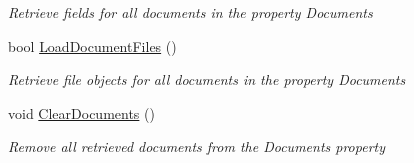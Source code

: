 \begin{DoxyCompactItemize}
\begin{DoxyCompactList}\small\item\em Retrieve fields for all documents in the property \textquotesingle{}Documents\textquotesingle{} \end{DoxyCompactList}\item 
bool \mbox{\hyperlink{class_database_object_acdf5c9ee898d4473350a2f4878af5a23}{Load\+Document\+Files}} ()
\begin{DoxyCompactList}\small\item\em Retrieve file objects for all documents in the property \textquotesingle{}Documents\textquotesingle{} \end{DoxyCompactList}\item 
void \mbox{\hyperlink{class_database_object_af9c4789dea0a14e5a2f914758d3bc54e}{Clear\+Documents}} ()
\begin{DoxyCompactList}\small\item\em Remove all retrieved documents from the \textquotesingle{}Documents\textquotesingle{} property \end{DoxyCompactList}\end{DoxyCompactItemize}
